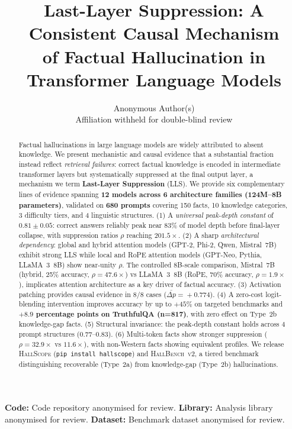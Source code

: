 \documentclass{article}
\title{Last-Layer Suppression: A Consistent Causal Mechanism\\
of Factual Hallucination in Transformer Language Models}
\author{Anonymous Author(s)\\
Affiliation withheld for double-blind review}
\begin{document}
\maketitle

\begin{abstract}
Factual hallucinations in large language models are widely attributed to absent
knowledge. We present mechanistic and causal evidence that a substantial fraction
instead reflect \emph{retrieval failures}: correct factual knowledge is encoded in
intermediate transformer layers but systematically suppressed at the final output
layer, a mechanism we term \textbf{Last-Layer Suppression} (LLS). We provide six
complementary lines of evidence spanning \textbf{12 models across 6 architecture
families (124M--8B parameters)}, validated on \textbf{680 prompts} covering 150
facts, 10 knowledge categories, 3 difficulty tiers, and 4 linguistic structures.
(1) A \emph{universal peak-depth constant} of $0.81\!\pm\!0.05$: correct answers
reliably peak near 83\% of model depth before final-layer collapse, with suppression
ratios $\rho$ reaching $201.5\times$.
(2) A sharp \emph{architectural dependency}: global and hybrid attention models
(GPT-2, Phi-2, Qwen, Mistral~7B) exhibit strong LLS while local and RoPE attention
models (GPT-Neo, Pythia, LLaMA~3~8B) show near-unity $\rho$.
The controlled 8B-scale comparison, Mistral~7B (hybrid, 25\% accuracy,
$\rho\!=\!47.6\times$) vs LLaMA~3~8B (RoPE, 70\% accuracy, $\rho\!=\!1.9\times$),
implicates attention architecture as a key driver of factual accuracy.
(3) Activation patching provides causal evidence in 8/8 cases
($\bar{\Delta p}\!=\!+0.774$).
(4) A zero-cost logit-blending intervention improves accuracy by up to $+45\%$ on
targeted benchmarks and \textbf{$+8.9$ percentage points on TruthfulQA (n=817)},
with zero effect on Type~2b knowledge-gap facts.
(5) Structural invariance: the peak-depth constant holds across 4 prompt structures
($0.77$--$0.83$).
(6) Multi-token facts show stronger suppression ($\rho\!=\!32.9\times$ vs
$11.6\times$), with non-Western facts showing equivalent profiles.
We release \textsc{HallScope} (\texttt{pip install hallscope}) and
\textsc{HallBench~v2}, a tiered benchmark distinguishing recoverable (Type~2a)
from knowledge-gap (Type~2b) hallucinations.
\end{abstract}

\noindent
\textbf{Code:} Code repository anonymised for review. \quad
\textbf{Library:} Analysis library anonymised for review. \quad
\textbf{Dataset:} Benchmark dataset anonymised for review.
\end{document}
